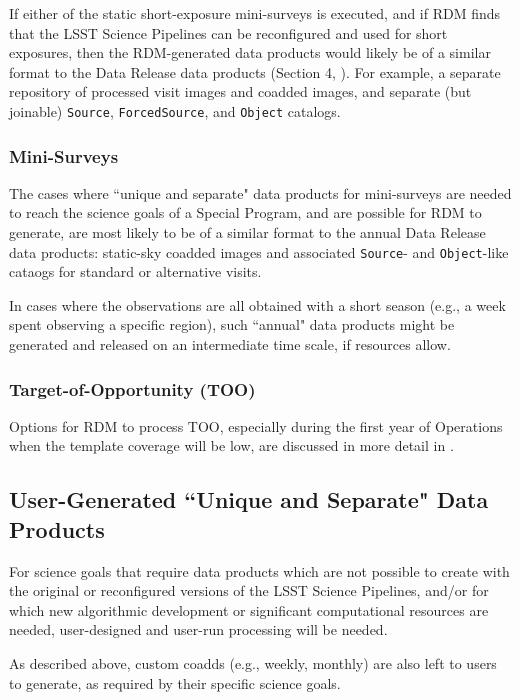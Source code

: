If either of the static short-exposure mini-surveys is executed, and if 
RDM finds that the LSST Science Pipelines can be reconfigured and used 
for short exposures, then the RDM-generated data products would likely be 
of a similar format to the Data Release data products 
(Section 4, ).
For example, a separate repository of processed visit images and coadded 
images, and separate (but joinable) {\tt Source}, {\tt ForcedSource}, and 
{\tt Object} catalogs.


\subsubsection{Mini-Surveys}

The cases where ``unique and separate" data products for mini-surveys are 
needed to reach the science goals of a Special Program, and are possible for 
RDM to generate, are most likely to be of a similar format to the annual 
Data Release data products: static-sky coadded images and associated 
{\tt Source}- and {\tt Object}-like cataogs for standard or alternative visits.

In cases where the observations are all obtained with a short season 
(e.g., a week spent observing a specific region), such ``annual" 
data products might be generated and released on an intermediate time scale, 
if resources allow.


\subsubsection{Target-of-Opportunity (TOO)}

Options for RDM to process TOO, especially during the first year of Operations 
when the template coverage will be low, are discussed in more detail in 
.


\subsection{User-Generated ``Unique and Separate" Data Products}\label{ssec:proc_user}

For science goals that require data products which are not possible to create with 
the original or reconfigured versions of the 
LSST Science Pipelines, and/or for which new algorithmic development or significant 
computational resources are needed, 
user-designed and user-run processing will be needed.

As described above, custom coadds (e.g., weekly, monthly) are also left to users 
to generate, as required by their specific science goals.

